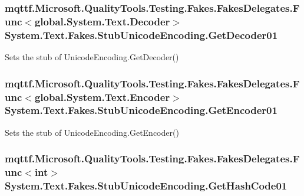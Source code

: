 \hypertarget{class_system_1_1_text_1_1_fakes_1_1_stub_unicode_encoding_a7045563686a56ccf40757e39a8e095ed}{
\subsubsection[{Get\-Decoder01}]{\setlength{\rightskip}{0pt plus 5cm}mqttf.\-Microsoft.\-Quality\-Tools.\-Testing.\-Fakes.\-Fakes\-Delegates.\-Func$<$global.\-System.\-Text.\-Decoder$>$ System.\-Text.\-Fakes.\-Stub\-Unicode\-Encoding.\-Get\-Decoder01}}\label{class_system_1_1_text_1_1_fakes_1_1_stub_unicode_encoding_a7045563686a56ccf40757e39a8e095ed}


Sets the stub of Unicode\-Encoding.\-Get\-Decoder()

\hypertarget{class_system_1_1_text_1_1_fakes_1_1_stub_unicode_encoding_af169393c529d8912e27ae879dc2cf72a}{
\subsubsection[{Get\-Encoder01}]{\setlength{\rightskip}{0pt plus 5cm}mqttf.\-Microsoft.\-Quality\-Tools.\-Testing.\-Fakes.\-Fakes\-Delegates.\-Func$<$global.\-System.\-Text.\-Encoder$>$ System.\-Text.\-Fakes.\-Stub\-Unicode\-Encoding.\-Get\-Encoder01}}\label{class_system_1_1_text_1_1_fakes_1_1_stub_unicode_encoding_af169393c529d8912e27ae879dc2cf72a}


Sets the stub of Unicode\-Encoding.\-Get\-Encoder()

\hypertarget{class_system_1_1_text_1_1_fakes_1_1_stub_unicode_encoding_a8bd78fadf33f11b449e3799d088d3d25}{
\subsubsection[{Get\-Hash\-Code01}]{\setlength{\rightskip}{0pt plus 5cm}mqttf.\-Microsoft.\-Quality\-Tools.\-Testing.\-Fakes.\-Fakes\-Delegates.\-Func$<$int$>$ System.\-Text.\-Fakes.\-Stub\-Unicode\-Encoding.\-Get\-Hash\-Code01}}\label{class_system_1_1_text_1_1_fakes_1_1_stub_unicode_encoding_a8bd78fadf33f11b449e3799d088d3d25}



